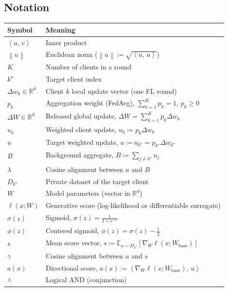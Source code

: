 \documentclass[bdcc,article,submit,pdftex]{Definitions/mdpi}
\newcommand{\R}{\mathbb{R}}
\newcommand{\ip}[2]{\left\langle #1,\,#2 \right\rangle}
\newcommand{\norm}[1]{\left\lVert #1 \right\rVert}
\newcommand{\E}{\mathbb{E}}
\newcommand{\tindex}{k^\star}
\newcommand{\uk}[1]{u_{#1}}
\newcommand{\utarget}{u}
\newcommand{\ukstar}{\uk{\tindex}}
\newcommand{\pdelta}[1]{p_{#1}\Delta w_{#1}}
\begin{document}
\subsection{Notation}

\begin{center}
\begin{tabular}{@{}ll@{}}
\toprule
Symbol & Meaning \\
\midrule
$\ip{u}{v}$ & Inner product \\
$\norm{u}$ & Euclidean norm ($\norm{u} \coloneqq \sqrt{\ip{u}{u}}$) \\
$K$ & Number of clients in a round \\
$\tindex$ & Target client index \\
$\Delta w_k \in \R^d$ & Client $k$ local update vector (one FL round) \\
$p_k$ & Aggregation weight (FedAvg), $\sum_{k=1}^K p_k=1$, $p_k\ge0$ \\
$\Delta W \in \R^d$ & Released global update, $\Delta W=\sum_{k=1}^K \pdelta{k}$ \\
$\uk{k}$ & Weighted client update, $\uk{k} \coloneqq \pdelta{k}$ \\
$\utarget$ & Target weighted update, $\utarget \coloneqq \ukstar = \pdelta{\tindex}$ \\
$B$ & Background aggregate, $B\coloneqq \sum_{j\neq \tindex} \uk{j}$ \\
$\lambda$ & Cosine alignment between $\utarget$ and $B$ \\
$D_{\tindex}$ & Private dataset of the target client \\
$W$ & Model parameters (vector in $\R^d$) \\
$\ell(x;W)$ & Generative score (log-likelihood or differentiable surrogate) \\
$\sigma(z)$ & Sigmoid, $\sigma(z)=\frac{1}{1+e^{-z}}$ \\
$\phi(z)$ & Centered sigmoid, $\phi(z)=\sigma(z)-\tfrac12$ \\
$s$ & Mean score vector, $s\coloneqq \E_{x\sim D_{\tindex}}[\nabla_W \ell(x;W_{\mathrm{base}})]$ \\
$\gamma$ & Cosine alignment between $\utarget$ and $s$ \\
$a(x)$ & Directional score, $a(x)\coloneqq \ip{\nabla_W \ell(x;W_{\mathrm{base}})}{\utarget}$ \\
$\wedge$ & Logical AND (conjunction) \\
\bottomrule
\end{tabular}
\end{center}
\end{document}
